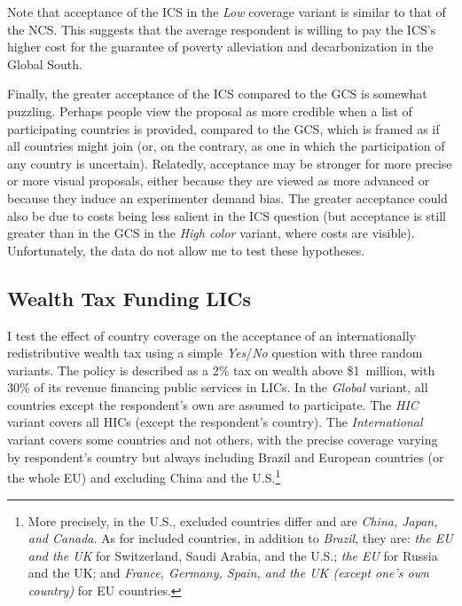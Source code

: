\documentclass[12pt,english]{article}
\begin{document}
Note that acceptance of the ICS in the \textit{Low} coverage variant is similar to that of the NCS. This suggests that the average respondent is willing to pay the ICS's higher cost for the guarantee of poverty alleviation and decarbonization in the Global South. %

Finally, the greater acceptance of the ICS compared to the GCS is somewhat puzzling. Perhaps people view the proposal as more credible when a list of participating countries is provided, compared to the GCS, which is framed as if all countries might join (or, on the contrary, as one in which the participation of any country is uncertain). Relatedly, acceptance may be stronger for more precise or more visual proposals, either because they are viewed as more advanced or because they induce an experimenter demand bias. The greater acceptance could also be due to costs being less salient in the ICS question (but acceptance is still greater than in the GCS in the \textit{High color} variant, where costs are visible). Unfortunately, the data do not allow me to test these hypotheses. %


\subsection{Wealth Tax Funding LICs}\label{subsec:wealth_tax}

I test the effect of country coverage on the acceptance of an internationally redistributive wealth tax using a simple \textit{Yes}/\textit{No} question with three random variants. The policy is described as a 2\% tax on wealth above \$1~million, with 30\% of its revenue financing public services in LICs. In the \textit{Global} variant, all countries except the respondent's own are assumed to participate. The \textit{HIC} variant covers all HICs (except the respondent's country). The \textit{International} variant covers some countries and not others, with the precise coverage varying by respondent's country but always including Brazil and European countries (or the whole EU) and excluding China and the U.S.\footnote{More precisely, in the U.S., excluded countries differ and are \textit{China, Japan, and Canada}. As for included countries, in addition to \textit{Brazil}, they are: \textit{the EU and the UK} for Switzerland, Saudi Arabia, and the U.S.; \textit{the EU} for Russia and the UK; and \textit{France, Germany, Spain, and the UK (except one's own country)} for EU countries.}
\end{document}
